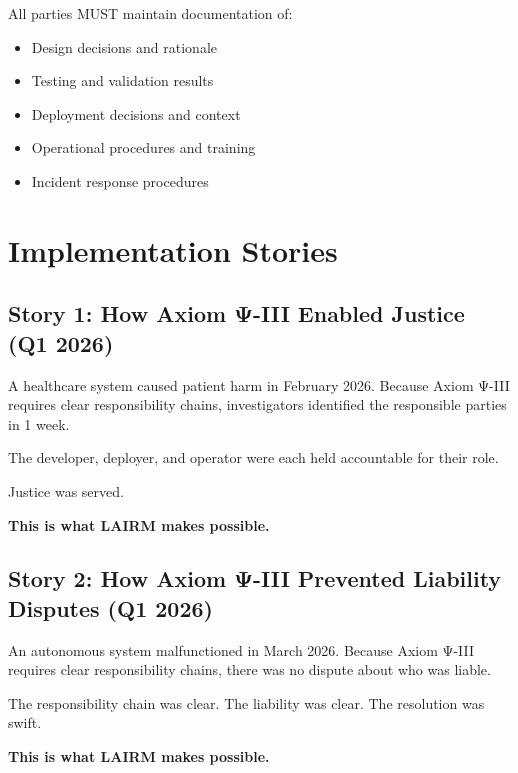 All parties MUST maintain documentation of:

\begin{itemize}
    \item Design decisions and rationale
    \item Testing and validation results
    \item Deployment decisions and context
    \item Operational procedures and training
    \item Incident response procedures
\end{itemize}

\vspace{0.5cm}

\section{Implementation Stories}

\subsection{Story 1: How Axiom Ψ-III Enabled Justice (Q1 2026)}

A healthcare system caused patient harm in February 2026. Because Axiom Ψ-III requires clear responsibility chains, investigators identified the responsible parties in 1 week.

The developer, deployer, and operator were each held accountable for their role.

Justice was served.

\textbf{This is what LAIRM makes possible.}

\subsection{Story 2: How Axiom Ψ-III Prevented Liability Disputes (Q1 2026)}

An autonomous system malfunctioned in March 2026. Because Axiom Ψ-III requires clear responsibility chains, there was no dispute about who was liable.

The responsibility chain was clear. The liability was clear. The resolution was swift.

\textbf{This is what LAIRM makes possible.}

\vspace{0.5cm}

